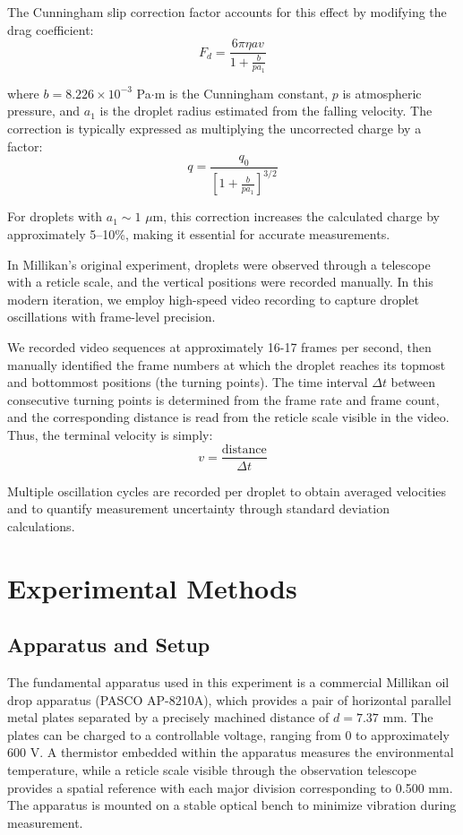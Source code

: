 \documentclass[11pt]{article}
\begin{document}
The Cunningham slip correction factor accounts for this effect by modifying the drag coefficient:
\begin{equation}
F_d = \frac{6\pi \eta a v}{1 + \frac{b}{p a_1}}
\end{equation}

where $b = 8.226 \times 10^{-3}$ Pa$\cdot$m is the Cunningham constant, $p$ is atmospheric pressure, and $a_1$ is the droplet radius estimated from the falling velocity. The correction is typically expressed as multiplying the uncorrected charge by a factor:
\begin{equation}
q = \frac{q_0}{\left[1 + \frac{b}{p a_1}\right]^{3/2}}
\end{equation}

For droplets with $a_1 \sim 1$ $\mu$m, this correction increases the calculated charge by approximately 5--10\%, making it essential for accurate measurements.

In Millikan's original experiment, droplets were observed through a telescope with a reticle scale, and the vertical positions were recorded manually. In this modern iteration, we employ high-speed video recording to capture droplet oscillations with frame-level precision. 

We recorded video sequences at approximately 16-17 frames per second, then manually identified the frame numbers at which the droplet reaches its topmost and bottommost positions (the turning points). The time interval $\Delta t$ between consecutive turning points is determined from the frame rate and frame count, and the corresponding distance is read from the reticle scale visible in the video. Thus, the terminal velocity is simply:
\begin{equation}
v = \frac{\text{distance}}{\Delta t}
\end{equation}

Multiple oscillation cycles are recorded per droplet to obtain averaged velocities and to quantify measurement uncertainty through standard deviation calculations.

\section{Experimental Methods}

\subsection{Apparatus and Setup}

The fundamental apparatus used in this experiment is a commercial Millikan oil drop apparatus (PASCO AP-8210A), which provides a pair of horizontal parallel metal plates separated by a precisely machined distance of $d = 7.37$ mm. The plates can be charged to a controllable voltage, ranging from 0 to approximately 600 V. A thermistor embedded within the apparatus measures the environmental temperature, while a reticle scale visible through the observation telescope provides a spatial reference with each major division corresponding to 0.500 mm. The apparatus is mounted on a stable optical bench to minimize vibration during measurement.
\end{document}
